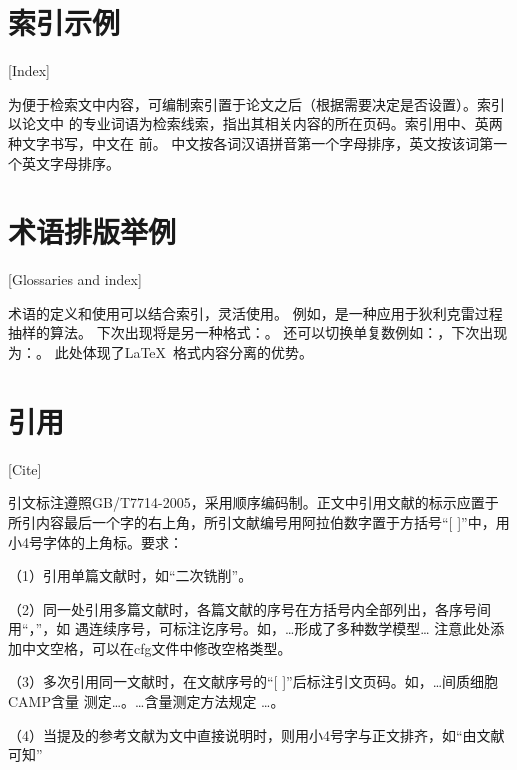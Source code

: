 \section{索引示例}[Index]

为便于检索文中内容，可编制索引置于论文之后（根据需要决定是否设置）。索引以论文中
的专业词语为检索线索，指出其相关内容的所在页码。索引用中、英两种文字书写，中文在
前。
中文按各词汉语拼音第一个字母排序，英文按该词第一个英文字母排序。

\section{术语排版举例}[Glossaries and index]

术语的定义和使用可以结合索引，灵活使用。
例如，\gtssbp 是一种应用于狄利克雷过程抽样的算法。
下次出现将是另一种格式：\gtssbp 。
还可以切换单复数例如：\gscnas ，下次出现为：\gscnas 。
此处体现了\LaTeX\ 格式内容分离的优势。

\section{引用}[Cite]

引文标注遵照GB/T7714-2005，采用顺序编码制。正文中引用文献的标示应置于所引内容最后一个字的右上角，所引文献编号用阿拉伯数字置于方括号“[ ]”中，用小4号字体的上角标。要求：

（1）引用单篇文献时，如“二次铣削\cite{cnproceed}”。

（2）同一处引用多篇文献时，各篇文献的序号在方括号内全部列出，各序号间用“，”，如
遇连续序号，可标注讫序号。如，…形成了多种数学模型\cite{cnarticle,cnproceed}…
注意此处添加中文空格，可以在cfg文件中修改空格类型。

（3）多次引用同一文献时，在文献序号的“[ ]”后标注引文页码。如，…间质细胞CAMP含量
测定\cite[100-197]{cnarticle}…。…含量测定方法规定
\cite[92]{cnarticle}…。

（4）当提及的参考文献为文中直接说明时，则用小4号字与正文排齐，如“由文献可知”

